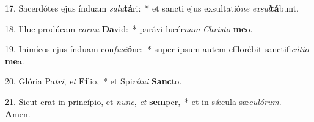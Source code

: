 17. Sacerdótes ejus índuam \textit{sa}\textit{lu}\textbf{tá}ri:~*  et sancti ejus exsultatió\textit{ne} \textit{ex}\textit{sul}\textbf{tá}bunt.\

18. Illuc prodúcam \textit{cor}\textit{nu} \textbf{Da}vid:~*  parávi lucér\textit{nam} \textit{Chris}\textit{to} \textbf{me}o.\

19. Inimícos ejus índuam con\textit{fu}\textit{si}\textbf{ó}ne:~*  super ipsum autem efflorébit sanctifi\textit{cá}\textit{ti}\textit{o} \textbf{me}a.\

20. Glória Pa\textit{tri}, \textit{et} \textbf{Fí}lio,~*  et Spi\textit{rí}\textit{tu}\textit{i} \textbf{Sanc}to.\

21. Sicut erat in princípio, et \textit{nunc}, \textit{et} \textbf{sem}per,~*  et in sǽcula sæ\textit{cu}\textit{ló}\textit{rum}. \textbf{A}men.\

